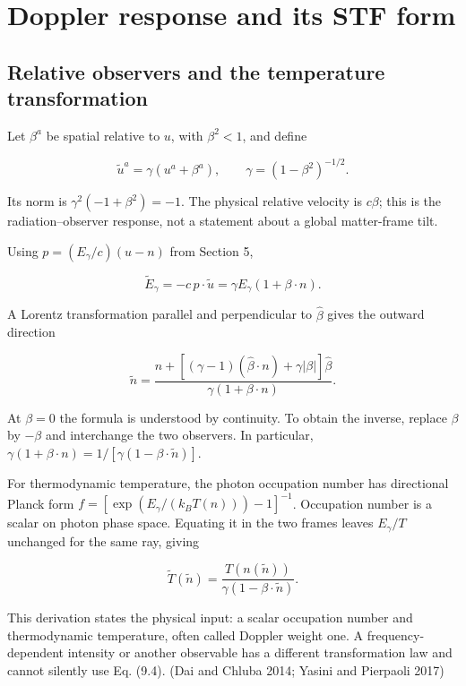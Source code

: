 \documentclass[
  11pt,
  a4paper]{article}
\begin{document}
\hypertarget{doppler-response-and-its-stf-form}{%
\section{Doppler response and its STF form}\label{doppler-response-and-its-stf-form}}

\hypertarget{relative-observers-and-the-temperature-transformation}{%
\subsection{Relative observers and the temperature transformation}\label{relative-observers-and-the-temperature-transformation}}

Let \(\beta^a\) be spatial relative to \(u\), with \(\beta^2<1\), and define

\[
\widetilde u^a=\gamma(u^a+\beta^a),\qquad
\gamma=(1-\beta^2)^{-1/2}.
\tag{9.1}
\]

Its norm is \(\gamma^2(-1+\beta^2)=-1\). The physical relative velocity is \(c\beta\); this is the radiation--observer response, not a statement about a global matter-frame tilt.

Using \(p=(E_\gamma/c)(u-n)\) from Section 5,

\[
\widetilde E_\gamma=-c\,p\cdot\widetilde u
=\gamma E_\gamma(1+\beta\cdot n).
\tag{9.2}
\]

A Lorentz transformation parallel and perpendicular to \(\widehat\beta\) gives the outward direction

\[
\widetilde n=
\frac{n+[(\gamma-1)(\widehat\beta\cdot n)+\gamma|\beta|]\widehat\beta}
{\gamma(1+\beta\cdot n)}.
\tag{9.3}
\]

At \(\beta=0\) the formula is understood by continuity. To obtain the inverse, replace \(\beta\) by \(-\beta\) and interchange the two observers. In particular,
\(\gamma(1+\beta\cdot n)=1/[\gamma(1-\beta\cdot\widetilde n)]\).

For thermodynamic temperature, the photon occupation number has directional Planck form \(f=[\exp(E_\gamma/(k_BT(n)))-1]^{-1}\). Occupation number is a scalar on photon phase space. Equating it in the two frames leaves \(E_\gamma/T\) unchanged for the same ray, giving

\[
\boxed{\widetilde T(\widetilde n)
=\frac{T(n(\widetilde n))}{\gamma(1-\beta\cdot\widetilde n)}}.
\tag{9.4}
\]

This derivation states the physical input: a scalar occupation number and thermodynamic temperature, often called Doppler weight one. A frequency-dependent intensity or another observable has a different transformation law and cannot silently use Eq. (9.4). (Dai and Chluba 2014; Yasini and Pierpaoli 2017)
\end{document}

